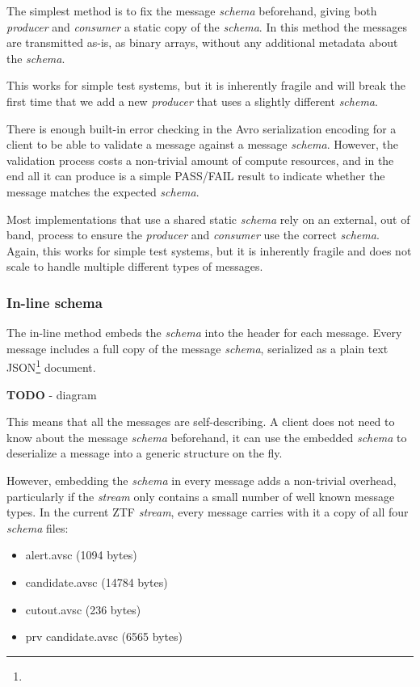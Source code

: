 \documentclass{article}
\newcommand{\json} {JSON\xspace}
\newcommand{\avro} {Avro\xspace}
\newcommand{\kfstream} {\textit{stream}\xspace}
\newcommand{\kfconsumer} {\textit{consumer}\xspace}
\newcommand{\kfproducer} {\textit{producer}\xspace}
\newcommand{\avschema} {\textit{schema}\xspace}
\newcommand{\deserz}    {deserialize\xspace}
\newcommand{\footurl}[1] {\footnote{\burl{#1}}}
\begin{document}
The simplest method is to fix the message \avschema beforehand, giving both \kfproducer and \kfconsumer a static copy of the \avschema.  In this method the  messages are transmitted as-is, as binary arrays, without any additional metadata about the \avschema.

This works for simple test systems, but it is inherently fragile and will break the first time that we add a new  \kfproducer that uses a slightly different \avschema.

There is enough built-in error checking in the \avro serialization encoding for a client to be able to validate a message against a message \avschema. However, the validation process costs a non-trivial amount of compute resources, and in the end all it can produce is a simple PASS/FAIL result to indicate whether the message matches the expected \avschema.

Most implementations that use a shared static \avschema rely on an external, out of band, process to ensure the \kfproducer and \kfconsumer use the correct \avschema. Again, this works for simple test systems, but it is inherently fragile and does not scale to handle multiple different types of messages.

\subsubsection{In-line schema}
\label{avro-inline-schema}

The in-line method embeds the \avschema into the header for each message.
Every message includes a full copy of the message \avschema, serialized as a plain text \json\footurl{https://www.json.org/} document.

\textbf{TODO} - diagram

This means that all the messages are self-describing. A client does not need to know about the message \avschema beforehand, it can use the embedded \avschema to \deserz a message into a generic structure on the fly.

However, embedding the \avschema in every message adds a non-trivial overhead, particularly if the \kfstream only contains a small number of well known message types.
In the current ZTF \kfstream, every message carries with it a copy of all four \avschema files:

\begin{itemize}
  \item alert.avsc (1094 bytes)
  \item candidate.avsc (14784 bytes)
  \item cutout.avsc (236 bytes)
  \item prv candidate.avsc (6565 bytes)
\end{itemize}
\end{document}
